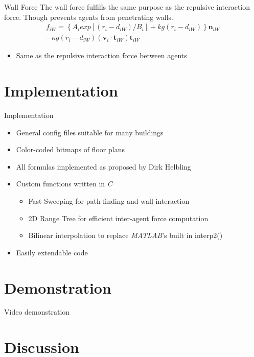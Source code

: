 \begin{frame}{Wall Force}
The wall force fulfills the same purpose as the repulsive interaction force. Though prevents agents from penetrating walls.
\begin{multline*}
f_{iW}=\left\{A_{i}exp[(r_{i}-d_{iW})/B_{i}]+kg(r_{i}-d_{iW})\right\}\mathbf{n}_{iW}\\-\kappa g(r_{i}-d_{iW})(\mathbf{v}_{i}\cdot\mathbf{t}_{iW})\mathbf{t}_{iW}
\end{multline*}
\begin{itemize}
\item Same as the repulsive interaction force between agents
\end{itemize}
\end{frame}

\section{Implementation}

\begin{frame}{Implementation}
\begin{itemize}
 \item General config files suitable for many buildings
 \item Color-coded bitmaps of floor plans
 \item All formulas implemented as proposed by Dirk Helbling
 \item Custom functions written in \textit{C}
 \begin{itemize}
  \item Fast Sweeping for path finding and wall interaction
  \item 2D Range Tree for efficient inter-agent force computation
  \item Bilinear interpolation to replace \textit{MATLAB}'s built in interp2()
 \end{itemize}
 \item Easily extendable code
\end{itemize}
\end{frame}


\section{Demonstration}

\begin{frame}{Video demonstration}
\end{frame}


\section{Discussion}

